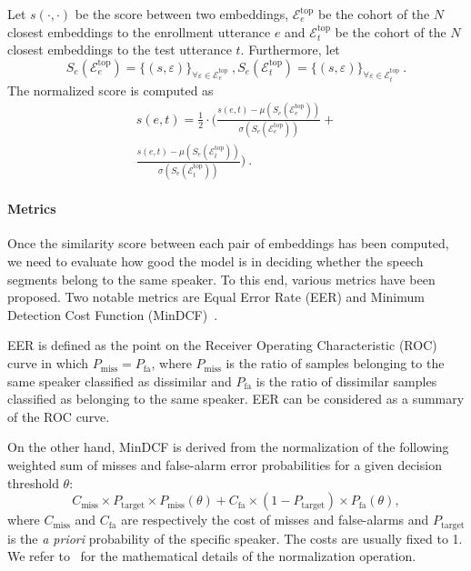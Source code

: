 \documentclass[conference]{IEEEtran}
\begin{document}
Let $s(\cdot,\cdot)$ be the score between two embeddings, $\mathcal{E}^{\text{top}}_e$ be the cohort of the $N$ closest embeddings to the enrollment utterance $e$ and $\mathcal{E}^{\text{top}}_t$ be the cohort of the $N$ closest embeddings to the test utterance $t$. Furthermore, let 
\begin{equation}
    S_e(\mathcal{E}^{\text{top}}_e) = \{(s,\varepsilon)\}_{\forall\varepsilon \in \mathcal{E}^{\text{top}}_e}~,
    S_e(\mathcal{E}^{\text{top}}_t) = \{(s,\varepsilon)\}_{\forall\varepsilon \in \mathcal{E}^{\text{top}}_t}~. 
\end{equation}
The normalized score is computed as
\begin{multline}
    s(e,t) = \frac{1}{2} \cdot \Bigg(\frac{s(e,t) - \mu(S_e(\mathcal{E}^{\text{top}}_e))}{\sigma(S_e(\mathcal{E}^{\text{top}}_e))} + \\
    \frac{s(e,t) - \mu(S_e(\mathcal{E}^{\text{top}}_t))}{\sigma(S_e(\mathcal{E}^{\text{top}}_t))}\Bigg)
    ~.
\end{multline}

\paragraph{Metrics}Once the similarity score between each pair of embeddings has been computed, we need to evaluate how good the model is in deciding whether the speech segments belong to the same speaker. To this end, various metrics have been proposed. Two notable metrics are Equal Error Rate (EER) and Minimum Detection Cost Function (MinDCF)~\cite{brummer2013bosaris,nist2018}. 

EER is defined as the point on the Receiver Operating Characteristic (ROC) curve in which $P_{\text{miss}} = P_{\text{fa}}$, where $P_{\text{miss}}$ is the ratio of samples belonging to the same speaker classified as dissimilar and $P_{\text{fa}}$ is the ratio of dissimilar samples classified as belonging to the same speaker. EER can be considered as a summary of the ROC curve.

On the other hand, MinDCF is derived from the normalization of the following weighted sum of misses and false-alarm error probabilities for a given decision threshold $\theta$:
\begin{equation}
    C_{\text{miss}} \times P_{\text{target}} \times P_{\text{miss}}(\theta) +
    C_{\text{fa}} \times (1 - P_{\text{target}}) \times P_{\text{fa}}(\theta) ,
\end{equation}
where $C_{\text{miss}}$ and $C_{\text{fa}}$ are respectively the cost of misses and false-alarms and $P_{\text{target}}$ is the \textit{a priori} probability of the specific speaker. The costs are usually fixed to 1. We refer to~\cite{nist2018} for the mathematical details of the normalization operation.
\end{document}
